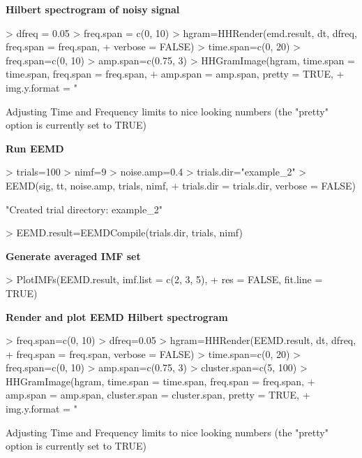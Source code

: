 \documentclass[12pt]{article}
\begin{document}
\textbf{Hilbert spectrogram of noisy signal}
\begin{Schunk}
\begin{Sinput}
> dfreq = 0.05
> freq.span = c(0, 10)
> hgram=HHRender(emd.result, dt, dfreq, freq.span = freq.span, 
+     verbose = FALSE)
> time.span=c(0, 20)
> freq.span=c(0, 10)
> amp.span=c(0.75, 3)
> HHGramImage(hgram, time.span = time.span, freq.span = freq.span,
+     amp.span = amp.span, pretty = TRUE,
+     img.y.format = "%.0f", img.x.format = "%.0f")
\end{Sinput}
\begin{Soutput}
Adjusting Time and Frequency limits to nice looking numbers (the "pretty" option is currently set to TRUE)
\end{Soutput}
\end{Schunk}

\textbf{Run EEMD}

\begin{Schunk}
\begin{Sinput}
> trials=100
> nimf=9
> noise.amp=0.4
> trials.dir="example_2"
> EEMD(sig, tt, noise.amp, trials, nimf, 
+     trials.dir = trials.dir, verbose = FALSE)
\end{Sinput}
\begin{Soutput}
[1] "Created trial directory: example_2"
\end{Soutput}
\begin{Sinput}
> EEMD.result=EEMDCompile(trials.dir, trials, nimf)
\end{Sinput}
\end{Schunk}

\textbf{Generate averaged IMF set}

\begin{Schunk}
\begin{Sinput}
> PlotIMFs(EEMD.result, imf.list = c(2, 3, 5),
+     res = FALSE, fit.line = TRUE)
\end{Sinput}
\end{Schunk}

\textbf{Render and plot EEMD Hilbert spectrogram}

\begin{Schunk}
\begin{Sinput}
> freq.span=c(0, 10)
> dfreq=0.05
> hgram=HHRender(EEMD.result, dt, dfreq, 
+     freq.span = freq.span, verbose = FALSE)
> time.span=c(0, 20)
> freq.span=c(0, 10)
> amp.span=c(0.75, 3)
> cluster.span=c(5, 100)
> HHGramImage(hgram, time.span = time.span, freq.span = freq.span, 
+     amp.span = amp.span, cluster.span = cluster.span, pretty = TRUE,
+     img.y.format = "%.0f", img.x.format = "%.0f")
\end{Sinput}
\begin{Soutput}
Adjusting Time and Frequency limits to nice looking numbers (the "pretty" option is currently set to TRUE)
\end{Soutput}
\end{Schunk}
\end{document}

